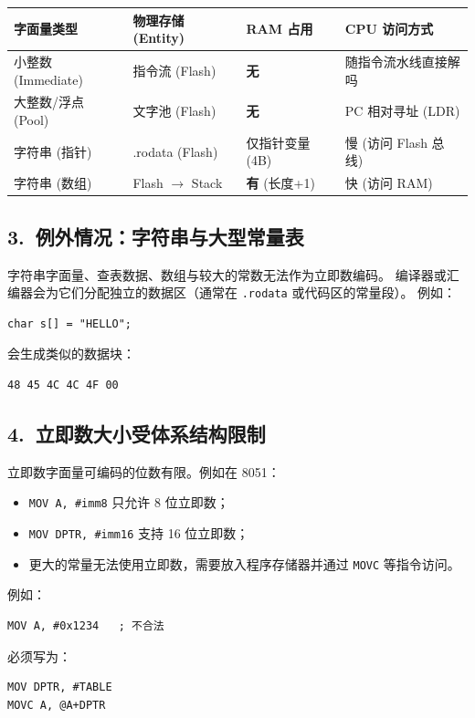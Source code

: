 \begin{center}
\begin{tabular}{|l|l|l|l|}
\hline
\textbf{字面量类型} & \textbf{物理存储 (Entity)} & \textbf{RAM 占用} & \textbf{CPU 访问方式} \\ \hline
小整数 (Immediate) & 指令流 (Flash) & \textbf{无} & 随指令流水线直接解吗 \\ \hline
大整数/浮点 (Pool) & 文字池 (Flash) & \textbf{无} & PC 相对寻址 (LDR) \\ \hline
字符串 (指针) & .rodata (Flash) & 仅指针变量 (4B) & 慢 (访问 Flash 总线) \\ \hline
字符串 (数组) & Flash $\rightarrow$ Stack & \textbf{有} (长度+1) & 快 (访问 RAM) \\ \hline
\end{tabular}
\end{center}



\subsection{3.~例外情况：字符串与大型常量表}
字符串字面量、查表数据、数组与较大的常数无法作为立即数编码。
编译器或汇编器会为它们分配独立的数据区（通常在 \texttt{.rodata} 或代码区的常量段）。
例如：
\begin{verbatim}
char s[] = "HELLO";
\end{verbatim}
会生成类似的数据块：
\begin{verbatim}
48 45 4C 4C 4F 00
\end{verbatim}

\subsection{4.~立即数大小受体系结构限制}
立即数字面量可编码的位数有限。例如在 8051：
\begin{itemize}
    \item \verb|MOV A, #imm8| 只允许 8 位立即数；
    \item \verb|MOV DPTR, #imm16| 支持 16 位立即数；
    \item 更大的常量无法使用立即数，需要放入程序存储器并通过 \verb|MOVC| 等指令访问。
\end{itemize}
例如：
\begin{verbatim}
MOV A, #0x1234   ; 不合法
\end{verbatim}
必须写为：
\begin{verbatim}
MOV DPTR, #TABLE
MOVC A, @A+DPTR
\end{verbatim}

